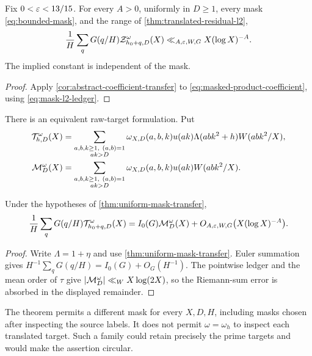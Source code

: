 \begin{theorem}
\label{thm:uniform-mask-transfer}
Fix $0<\varepsilon<13/15$.  For every $A>0$, uniformly in $D\geq1$, every mask
\eqref{eq:bounded-mask}, and the range of
\cref{thm:translated-residual-l2},
\begin{equation}
 \frac1H\sum_qG(q/H)
 \mathcal Z_{h_0+q,D}^{\omega}(X)
 \ll_{A,\varepsilon,W,G}X(\log X)^{-A}.
 \label{eq:uniform-mask-transfer}
\end{equation}
The implied constant is independent of the mask.
\end{theorem}

\begin{proof}
Apply \cref{cor:abstract-coefficient-transfer} to
\eqref{eq:masked-product-coefficient}, using
\eqref{eq:mask-l2-ledger}.
\end{proof}

There is an equivalent raw-target formulation.  Put
\begin{align}
 \mathcal T_{h,D}^{\omega}(X)
 &=\sum_{\substack{a,b,k\geq1,\ (a,b)=1\\ak>D}}
 \omega_{X,D}(a,b,k)u(ak)
 \Lambda(abk^2+h)W(abk^2/X),
 \label{eq:raw-masked-transform}\\
 \mathcal M_D^{\omega}(X)
 &=\sum_{\substack{a,b,k\geq1,\ (a,b)=1\\ak>D}}
 \omega_{X,D}(a,b,k)u(ak)W(abk^2/X).
 \label{eq:raw-mask-model}
\end{align}

\begin{corollary}
\label{cor:uniform-raw-mask-model}
Under the hypotheses of \cref{thm:uniform-mask-transfer},
\begin{equation}
 \frac1H\sum_qG(q/H)\mathcal T_{h_0+q,D}^{\omega}(X)
 =I_0(G)\mathcal M_D^{\omega}(X)
 +O_{A,\varepsilon,W,G}\bigl(X(\log X)^{-A}\bigr).
 \label{eq:uniform-raw-mask-model}
\end{equation}
\end{corollary}

\begin{proof}
Write $\Lambda=1+\eta$ and use
\cref{thm:uniform-mask-transfer}.  Euler summation gives
$H^{-1}\sum_qG(q/H)=I_0(G)+O_G(H^{-1})$.  The pointwise ledger and the
mean order of $\tau$ give
$|\mathcal M_D^\omega|\ll_WX\log(2X)$, so the Riemann-sum error is absorbed in the
displayed remainder.
\end{proof}

\begin{remark}
The theorem permits a different mask for every $X,D,H$, including masks
chosen after inspecting the source labels.  It does not permit
$\omega=\omega_h$ to inspect each translated target.  Such a family could
retain precisely the prime targets and would make the assertion circular.
\end{remark}
